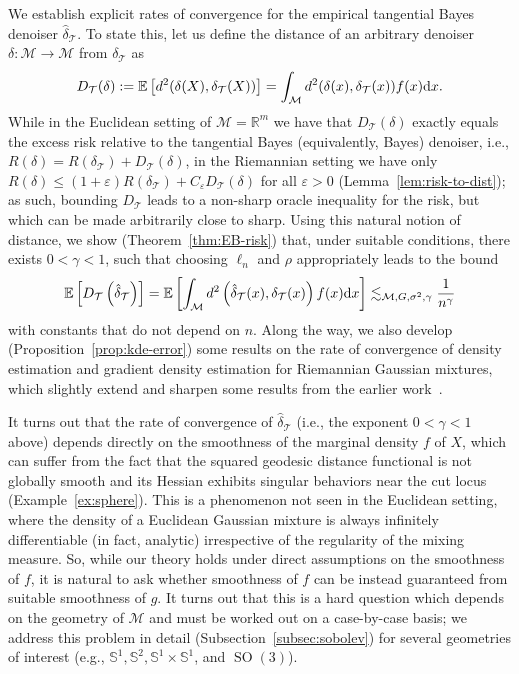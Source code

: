 \documentclass[preprint]{imsart}
\theoremstyle{plain}
\theoremstyle{definition}
\newcommand{\Rbb}{\mathbb{R}}
\newcommand{\Ebb}{\mathbb{E}}
\newcommand{\Mcal}{\mathcal{M}}
\newcommand{\diff}{\textnormal{d}}
\newcommand{\T}{\mathcal{T}}
\DeclareMathOperator{\SO}{SO}
\begin{document}
    We establish explicit rates of convergence for the empirical tangential Bayes denoiser $\hat{\delta}_{\T}$.
    To state this, let us define the distance of an arbitrary denoiser $\delta:\Mcal\to\Mcal$ from $\delta_{\T}$ as
    \begin{equation}\label{eqn:def-dist}
        D_{\T}(\delta) := \Ebb\left[d^2(\delta(X),\delta_{\T}(X))\right] =\int_{\Mcal}d^2(\delta(x),\delta_{\T}(x))f(x)\diff x.
    \end{equation}
    While in the Euclidean setting of $\Mcal=\Rbb^m$ we have that $D_{\T}(\delta)$ exactly equals the excess risk relative to the tangential Bayes (equivalently, Bayes) denoiser, i.e., $R(\delta)=R(\delta_{\T})+D_{\T}(\delta)$, in the Riemannian setting we have only
    $R(\delta)\le (1+\varepsilon)R(\delta_{\T})+C_{\varepsilon}D_{\T}(\delta)$ for all $\varepsilon>0$ (Lemma~\ref{lem:risk-to-dist}); as such, bounding $D_{\T}$ leads to a non-sharp oracle inequality for the risk, but which can be made arbitrarily close to sharp.
    Using this natural notion of distance, we show (Theorem~\ref{thm:EB-risk}) that, under suitable conditions, there exists $0<\gamma<1$, such that choosing $\ell_n$ and $\rho$ appropriately leads to the bound
    \begin{equation}\label{eqn:EB-result}
        \Ebb\left[D_{\T}\left(\hat{\delta}_{\T}\right)\right] = \Ebb\left[\int_{\Mcal}d^2\left(\hat{\delta}_{\T}(x),\delta_{\T}(x)\right)f(x)\diff x\right] \lesssim_{\Mcal,G,\sigma^2,\gamma} \frac{1}{n^{\gamma}}
    \end{equation}
    with constants that do not depend on $n$.
    Along the way, we also develop (Proposition~\ref{prop:kde-error}) some results on the rate of convergence of density estimation and gradient density estimation for Riemannian Gaussian mixtures, which slightly extend and sharpen some results from the earlier work~\cite{Hendriks1990}.

    It turns out that the rate of convergence of $\hat{\delta}_{\T}$ (i.e., the exponent $0<\gamma<1$ above) depends directly on the smoothness of the marginal density $f$ of $X$, which can suffer from the fact that the squared geodesic distance functional is not globally smooth and its Hessian exhibits singular behaviors near the cut locus (Example~\ref{ex:sphere}).
    This is a phenomenon not seen in the Euclidean setting, where the density of a Euclidean Gaussian mixture is always infinitely differentiable (in fact, analytic) irrespective of the regularity of the mixing measure.
    So, while our theory holds under direct assumptions on the smoothness of $f$, it is natural to ask whether smoothness of $f$ can be instead guaranteed from suitable smoothness of $g$.   It turns out that this is a hard question which depends on the geometry of $\Mcal$ and must be worked out on a case-by-case basis; we address this problem in detail (Subsection~\ref{subsec:sobolev}) for several geometries of interest (e.g., $\mathbb{S}^1,\mathbb{S}^2,\mathbb{S}^1\times\mathbb{S}^1$, and $\SO(3)$).
    
\end{document}
